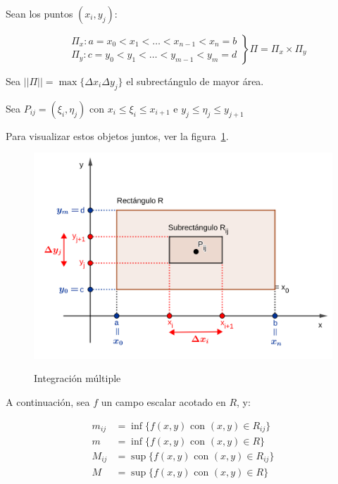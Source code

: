 \documentclass{article}
\begin{document}
Sean los puntos $(x_i, y_j)$:

\begin{equation}
\left.
\begin{array}{ll}
& \Pi_x: a = x_0 < x_1 < \ldots < x_{n-1} < x_n = b \\
& \Pi_y: c = y_0 < y_1 < \ldots < y_{m-1} < y_m = d
\end{array}
\right\} \Pi = \Pi_x \times \Pi_y
\end{equation}

Sea $||\Pi|| = \max\{ \Delta x_i \Delta y_j \}$ el subrectángulo de mayor área.

Sea $P_{ij} = (\xi_i, \eta_j)$ con $x_i \leq \xi_i \leq x_{i+1}$ e $y_j \leq \eta_j \leq y_{j+1}$

Para visualizar estos objetos juntos, ver la figura~\ref{fig:intmul}.

\begin{figure}[ht]
\centering
\caption{Integración múltiple}
\includegraphics[scale=0.8]{img/integrales/integracion_multiple.png}
\label{fig:intmul}
\end{figure}

A continuación, sea $f$ un campo escalar acotado en $R$, y:

\begin{subequations}
\begin{align}
m_{ij} &= \inf \{ f(x,y) \text{ con } (x,y) \in R_{ij} \} \\
m &= \inf \{ f(x,y) \text{ con } (x,y) \in R \} \\
M_{ij} &= \sup \{ f(x,y) \text{ con } (x,y) \in R_{ij} \} \\
M &= \sup\{ f(x,y) \text{ con } (x,y) \in R \} \\
\end{align}
\end{subequations}
\end{document}
